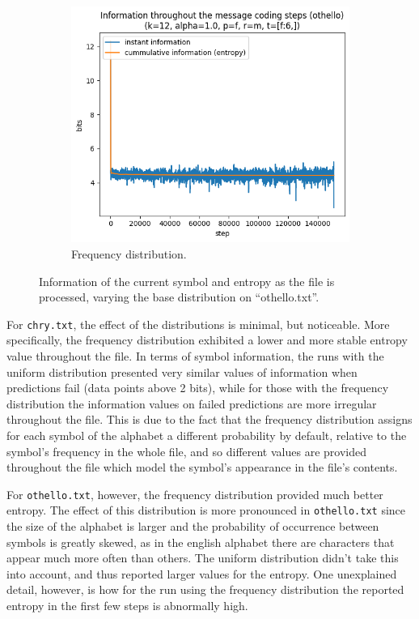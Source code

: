 \documentclass{article}
\begin{document}
\begin{figure}
\begin{subfigure}[b]{0.45\textwidth}
\begin{center}
            \includegraphics[width=1.0\linewidth]{../scripts/images/othello_12_1.0_f_m_[f:6,].png}
        \end{center}
        \caption{Frequency distribution.}
        \label{fig:results-distribution-other-frequency}
    \end{subfigure}
    \caption{Information of the current symbol and entropy as the file is processed, varying the base distribution on ``othello.txt''.}
    \label{fig:results-distribution-other}
\end{figure}

For \verb|chry.txt|, the effect of the distributions is minimal, but noticeable.
More specifically, the frequency distribution exhibited a lower and more stable entropy value throughout the file.
In terms of symbol information, the runs with the uniform distribution presented very similar values of information when predictions fail (data points above 2 bits), while for those with the frequency distribution the information values on failed predictions are more irregular throughout the file.
This is due to the fact that the frequency distribution assigns for each symbol of the alphabet a different probability by default, relative to the symbol's frequency in the whole file, and so different values are provided throughout the file which model the symbol's appearance in the file's contents.

For \verb|othello.txt|, however, the frequency distribution provided much better entropy.
The effect of this distribution is more pronounced in \verb|othello.txt| since the size of the alphabet is larger and the probability of occurrence between symbols is greatly skewed, as in the english alphabet there are characters that appear much more often than others.
The uniform distribution didn't take this into account, and thus reported larger values for the entropy.
One unexplained detail, however, is how for the run using the frequency distribution the reported entropy in the first few steps is abnormally high.
\end{document}
